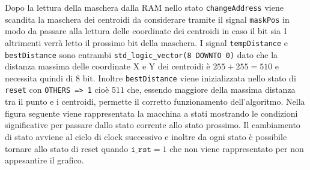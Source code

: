 \documentclass{article}
\begin{document}
	\newline 
	Dopo la lettura della maschera dalla RAM nello stato \texttt{changeAddress} viene scandita la maschera dei centroidi da considerare tramite il signal \texttt{maskPos} in modo da passare alla lettura delle coordinate dei centroidi in caso il bit sia 1 altrimenti verr\`{a} letto il prossimo bit della maschera.
	\newline
	I signal \texttt{tempDistance} e \texttt{bestDistance} sono entrambi \texttt{std\_logic\_vector(8 DOWNTO 0)} dato che la distanza massima delle coordinate X e Y dei centroidi \`{e} $255+255=510$ e necessita quindi di 8 bit. Inoltre \texttt{bestDistance} viene inizializzata nello stato di \texttt{reset} con \texttt{OTHERS => \textsc{}1\textsc{}} cio\`{e} $511$ che, essendo maggiore della massima distanza tra il punto e i centroidi, permette il corretto funzionamento dell'algoritmo.
	\newline
	Nella figura seguente viene rappresentata la macchina a stati mostrando le condizioni significative per passare dallo stato corrente allo stato prossimo. Il cambiamento di stato avviene al ciclo di clock successivo e inoltre da ogni stato \`{e} possibile tornare allo stato di reset quando $\texttt{i\_rst}=1$ che non viene rappresentato per non appesantire il grafico.
	\pagebreak
	
	
	 
	\pagebreak
	
	
\end{document}
